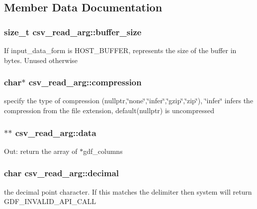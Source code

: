 \subsection{Member Data Documentation}
\subsubsection[{\texorpdfstring{buffer\+\_\+size}{buffer_size}}]{\setlength{\rightskip}{0pt plus 5cm}size\+\_\+t csv\+\_\+read\+\_\+arg\+::buffer\+\_\+size}\hypertarget{structcsv__read__arg_af495562c6d61625c78bc981804ba7617}{}\label{structcsv__read__arg_af495562c6d61625c78bc981804ba7617}
If input\+\_\+data\+\_\+form is H\+O\+S\+T\+\_\+\+B\+U\+F\+F\+ER, represents the size of the buffer in bytes. Unused otherwise 
\subsubsection[{\texorpdfstring{compression}{compression}}]{\setlength{\rightskip}{0pt plus 5cm}char$\ast$ csv\+\_\+read\+\_\+arg\+::compression}\hypertarget{structcsv__read__arg_ae1f3e5ee7f08808863f66deae5924677}{}\label{structcsv__read__arg_ae1f3e5ee7f08808863f66deae5924677}
specify the type of compression (nullptr,\char`\"{}none\char`\"{},\char`\"{}infer\char`\"{},\char`\"{}gzip\char`\"{},\char`\"{}zip\char`\"{}), \char`\"{}infer\char`\"{} infers the compression from the file extension, default(nullptr) is uncompressed 
\subsubsection[{\texorpdfstring{data}{data}}]{$\ast$$\ast$ csv\+\_\+read\+\_\+arg\+::data}\hypertarget{structcsv__read__arg_a07311a60d8ccd7dc263693b7ad47b6bd}{}\label{structcsv__read__arg_a07311a60d8ccd7dc263693b7ad47b6bd}
Out\+: return the array of $\ast$gdf\+\_\+columns 
\subsubsection[{\texorpdfstring{decimal}{decimal}}]{\setlength{\rightskip}{0pt plus 5cm}char csv\+\_\+read\+\_\+arg\+::decimal}\hypertarget{structcsv__read__arg_ad159be13cd045691a44d59de8e8d56f5}{}\label{structcsv__read__arg_ad159be13cd045691a44d59de8e8d56f5}
the decimal point character. If this matches the delimiter then system will return G\+D\+F\+\_\+\+I\+N\+V\+A\+L\+I\+D\+\_\+\+A\+P\+I\+\_\+\+C\+A\+LL 
